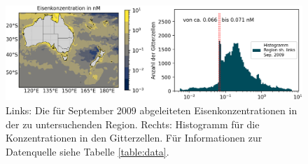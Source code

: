 \documentclass[12pt,a4paper,onecolumn]{scrartcl}
\begin{document}
\begin{figure}[!htb]
\includegraphics[width=\textwidth]{bilder/nutrient_iron.png}
\caption{Links: Die für September 2009 abgeleiteten Eisenkonzentrationen in der zu untersuchenden Region. Rechts: Histogramm für die Konzentrationen in den Gitterzellen. Für Informationen zur Datenquelle siehe Tabelle \ref{table:data}.} \label{fig:nutrient_iron}
\end{figure}
\end{document}

